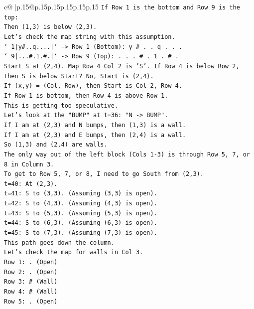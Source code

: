 \documentclass{article}
\begin{document}
{\begin{supertabular}{c@{$\;$}|p{.15\linewidth}@{}p{.15\linewidth}p{.15\linewidth}p{.15\linewidth}p{.15\linewidth}p{.15\linewidth}}
{{{\texttt{If Row 1 is the bottom and Row 9 is the top:} \\
\texttt{Then (1,3) is below (2,3).} \\
\texttt{Let's check the map string with this assumption.} \\
\texttt{` 1|y\#..q....|` {-}> Row 1 (Bottom): y \# . . q . . .} \\
\texttt{` 9|...\#.1.\#.|` {-}> Row 9 (Top): . . . \# . 1 . \# .} \\
\texttt{Start S at (2,4). Map Row 4 Col 2 is 'S'. If Row 4 is below Row 2, then S is below Start? No, Start is (2,4).} \\
\texttt{If (x,y) = (Col, Row), then Start is Col 2, Row 4.} \\
\texttt{If Row 1 is bottom, then Row 4 is above Row 1.} \\
\texttt{This is getting too speculative.} \\
\texttt{Let's look at the "BUMP" at t=36: "N {-}> BUMP".} \\
\texttt{If I am at (2,3) and N bumps, then (1,3) is a wall.} \\
\texttt{If I am at (2,3) and E bumps, then (2,4) is a wall.} \\
\texttt{So (1,3) and (2,4) are walls.} \\
\texttt{The only way out of the left block (Cols 1{-}3) is through Row 5, 7, or 8 in Column 3.} \\
\texttt{To get to Row 5, 7, or 8, I need to go South from (2,3).} \\
\texttt{t=40: At (2,3).} \\
\texttt{t=41: S to (3,3). (Assuming (3,3) is open).} \\
\texttt{t=42: S to (4,3). (Assuming (4,3) is open).} \\
\texttt{t=43: S to (5,3). (Assuming (5,3) is open).} \\
\texttt{t=44: S to (6,3). (Assuming (6,3) is open).} \\
\texttt{t=45: S to (7,3). (Assuming (7,3) is open).} \\
\texttt{This path goes down the column.} \\
\texttt{Let's check the map for walls in Col 3.} \\
\texttt{Row 1: . (Open)} \\
\texttt{Row 2: . (Open)} \\
\texttt{Row 3: \# (Wall)} \\
\texttt{Row 4: \# (Wall)} \\
\texttt{Row 5: . (Open)} \\
}}}
\end{supertabular}}
\end{document}
